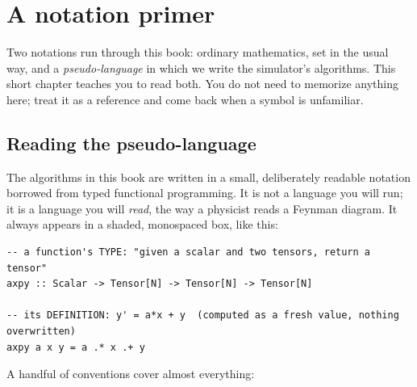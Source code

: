 \chapter*{A notation primer}

Two notations run through this book: ordinary mathematics, set in the usual way,
and a \emph{pseudo-language} in which we write the simulator's algorithms. This
short chapter teaches you to read both. You do not need to memorize anything
here; treat it as a reference and come back when a symbol is unfamiliar.

\section*{Reading the pseudo-language}

The algorithms in this book are written in a small, deliberately readable
notation borrowed from typed functional programming. It is not a language you
will run; it is a language you will \emph{read}, the way a physicist reads a
Feynman diagram. It always appears in a shaded, monospaced box, like this:

\begin{lstlisting}[style=l4style]
-- a function's TYPE: "given a scalar and two tensors, return a tensor"
axpy :: Scalar -> Tensor[N] -> Tensor[N] -> Tensor[N]

-- its DEFINITION: y' = a*x + y  (computed as a fresh value, nothing overwritten)
axpy a x y = a .* x .+ y
\end{lstlisting}

A handful of conventions cover almost everything:

